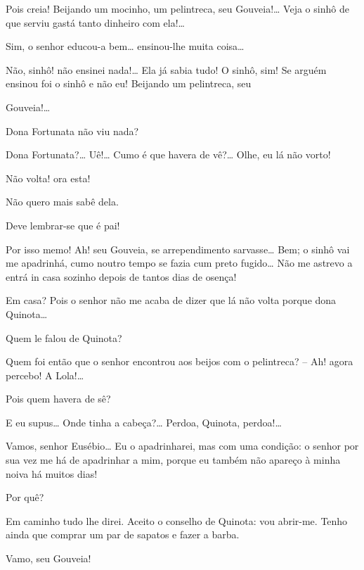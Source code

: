  Pois creia! Beijando um mocinho, um pelintreca, seu Gouveia!\ldots{}
Veja o sinhô de que serviu gastá tanto dinheiro com ela!\ldots{}

 Sim, o senhor educou-a bem\ldots{} ensinou-lhe muita coisa\ldots{}

  Não, sinhô! não ensinei nada!\ldots{} Ela já sabia tudo!
O sinhô, sim! Se arguém ensinou foi o sinhô e não eu! Beijando um pelintreca, seu

Gouveia!\ldots{}

 Dona Fortunata não viu nada?

 Dona Fortunata?\ldots{} Uê!\ldots{} Cumo é que havera de vê?\ldots{} Olhe, eu lá
não vorto!

 Não volta! ora esta!

 Não quero mais sabê dela.

 Deve lembrar-se que é pai!

 Por isso memo! Ah! seu Gouveia, se arrependimento sarvasse\ldots{}
Bem; o sinhô vai me apadrinhá, cumo noutro tempo se fazia cum preto fugido\ldots{} Não
me astrevo a entrá in casa sozinho depois de tantos dias de osença!

 Em casa? Pois o senhor não me acaba de dizer que lá não volta
porque dona Quinota\ldots{}

 Quem le falou de Quinota?

 Quem foi então que o senhor encontrou aos beijos com o
pelintreca? -- Ah! agora percebo! A Lola!\ldots{}

 Pois quem havera de sê?

 E eu supus\ldots{} Onde tinha a cabeça?\ldots{} Perdoa, Quinota, perdoa!\ldots{}

Vamos, senhor Eusébio\ldots{} Eu o apadrinharei, mas com uma condição: o senhor
por sua vez me há de apadrinhar a mim, porque eu também não apareço à minha
noiva há muitos dias!

 Por quê?

 Em caminho tudo lhe direi.  Aceito o conselho de
Quinota: vou abrir-me.  Tenho ainda que comprar um par de sapatos e fazer a
barba.

 Vamo, seu Gouveia! 

